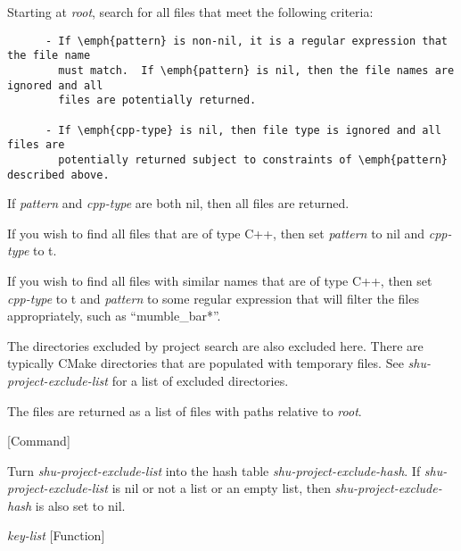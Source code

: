 \begin{doc-string}
Starting at \emph{root}, search for all files that meet the following criteria:

\small{\begin{verbatim}
      - If \emph{pattern} is non-nil, it is a regular expression that the file name
        must match.  If \emph{pattern} is nil, then the file names are ignored and all
        files are potentially returned.

      - If \emph{cpp-type} is nil, then file type is ignored and all files are
        potentially returned subject to constraints of \emph{pattern} described above.
\end{verbatim}}

If \emph{pattern} and \emph{cpp-type} are both nil, then all files are returned.

If you wish to find all files that are of type C++, then set \emph{pattern} to nil and
\emph{cpp-type} to t.

If you wish to find all files with similar names that are of type C++, then set
\emph{cpp-type} to t and \emph{pattern} to some regular expression that will filter the files
appropriately, such as ``mumble\_bar*''.

The directories excluded by project search are also excluded here.  There are
typically CMake directories that are populated with temporary files.  See
\emph{shu-project-exclude-list} for a list of excluded directories.

The files are returned as a list of files with paths relative to \emph{root}.
\end{doc-string}

\vspace{1em}
\noindent
{}
\usebox{\funcname}
 \hfill [Command]

\begin{doc-string}
Turn \emph{shu-project-exclude-list} into the hash table \emph{shu-project-exclude-hash}.
If \emph{shu-project-exclude-list} is nil or not a list or an empty list, then
\emph{shu-project-exclude-hash} is also set to nil.
\end{doc-string}

\vspace{1em}
\noindent
{}
\usebox{\funcname}\emph{key-list}
 \hfill [Function]

